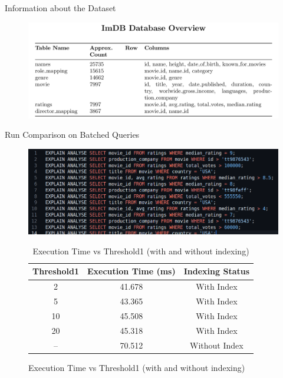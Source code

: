 \documentclass[Serif, 10pt, brown]{beamer}
\theoremstyle{example}
\theoremstyle{plain}
\begin{document}
\begin{frame}{Information about the Dataset}
	\begin{figure}
        \centering
        \includegraphics[width=1\linewidth]{../images/Screenshot from 2025-05-01 12-10-35.png}
    \end{figure}
\end{frame}

\begin{frame}{Run Comparison on Batched Queries}
	\begin{figure}
        \centering
        \includegraphics[width=0.8\linewidth]{../images/Screenshot from 2025-05-01 15-33-39.png}
        \begin{table}[ht]
			\centering
			\caption{Execution Time vs Threshold1 (with and without indexing)}
			\begin{tabular}{|c|c|c|}
			\hline
			\textbf{Threshold1} & \textbf{Execution Time (ms)} & \textbf{Indexing Status} \\
			\hline
			2   & 41.678  & With Index \\
			5   & 43.365  & With Index \\
			10  & 45.508  & With Index \\
			20  & 45.318  & With Index \\
			--  & 70.512  & Without Index \\
			\hline
			\end{tabular}
			\end{table}
			
    \end{figure}
\end{frame}
\end{document}

